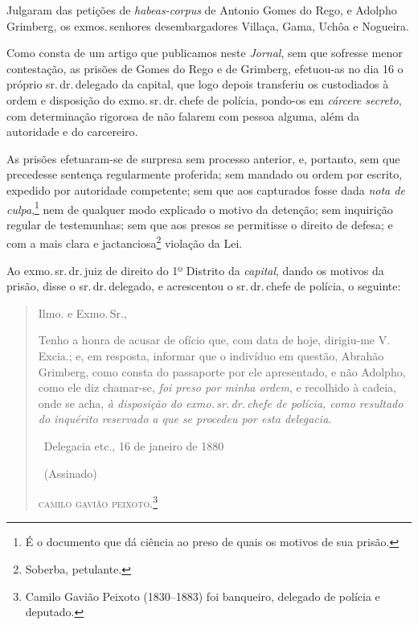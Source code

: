 Julgaram das petições de \emph{habeas-corpus} de Antonio Gomes do Rego,
e Adolpho Grimberg, os exmos.\,senhores desembargadores Villaça, Gama,
Uchôa e Nogueira.

Como consta de um artigo que publicamos neste \emph{Jornal}, sem que
sofresse menor contestação, as prisões de Gomes do Rego e de Grimberg,
efetuou-as no dia 16 o próprio sr.\,dr.\,delegado da capital, que logo
depois transferiu os custodiados à ordem e disposição do exmo.\,sr.\,dr.\,chefe de polícia, pondo-os em \emph{cárcere secreto}, com determinação
rigorosa de não falarem com pessoa alguma, além da autoridade e do
carcereiro.

As prisões efetuaram-se de surpresa sem processo anterior, e, portanto,
sem que precedesse sentença regularmente proferida; sem mandado ou ordem
por escrito, expedido por autoridade competente; sem que aos capturados
fosse dada \emph{nota de culpa},\footnote{É o documento que dá ciência
  ao preso de quais os motivos de sua prisão.} nem de qualquer
modo explicado o motivo da detenção; sem inquirição regular de
testemunhas; sem que aos presos se permitisse o direito de defesa; e com
a mais clara e jactanciosa\footnote{Soberba, petulante.} violação da
Lei.

Ao exmo.\,sr.\,dr.\,juiz de direito do 1º Distrito da \emph{capital}, dando
os motivos da prisão, disse o sr.\,dr.\,delegado, e acrescentou o sr.\,dr.\,chefe de polícia, o seguinte:

\begin{quote}

Ilmo. e Exmo.\,Sr.,

Tenho a honra de acusar de ofício que, com data de hoje, dirigiu-me V.
Excia.; e, em resposta, informar que o indivíduo em questão, Abrahão
Grimberg, como consta do passaporte por ele apresentado, e não Adolpho,
como ele diz chamar-se, \emph{foi preso por minha ordem}, e recolhido à
cadeia, onde se acha, \emph{à disposição do exmo.\,sr.\,dr.\,chefe de
polícia, como resultado do inquérito reservado a que se procedeu por
esta delegacia}.\medskip

\hfill\ Delegacia etc., 16 de janeiro de 1880

\hfill\ (Assinado)

\hfill\textsc{camilo gavião peixoto}.\footnote{Camilo Gavião Peixoto (1830--1883)
  foi banqueiro, delegado de polícia e deputado.}
  \end{quote}

